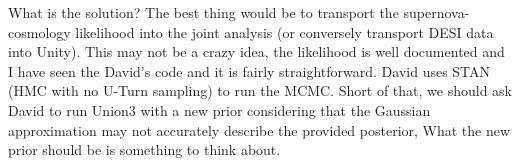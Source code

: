\documentclass[11pt,a4paper]{article}
\begin{document}
What is the solution? The best thing would be to transport
the supernova-cosmology likelihood into the joint analysis (or conversely transport DESI data into Unity). 
This may not be a crazy idea, the likelihood is well documented
and I have seen the David's code and it is fairly straightforward.  David uses STAN  (HMC
with no U-Turn sampling) to run the MCMC.
Short of that, we should ask
David to run Union3 with a new prior considering that the Gaussian approximation may not accurately describe the provided posterior, 
What the new prior should be is something to think about.  




\end{document}
